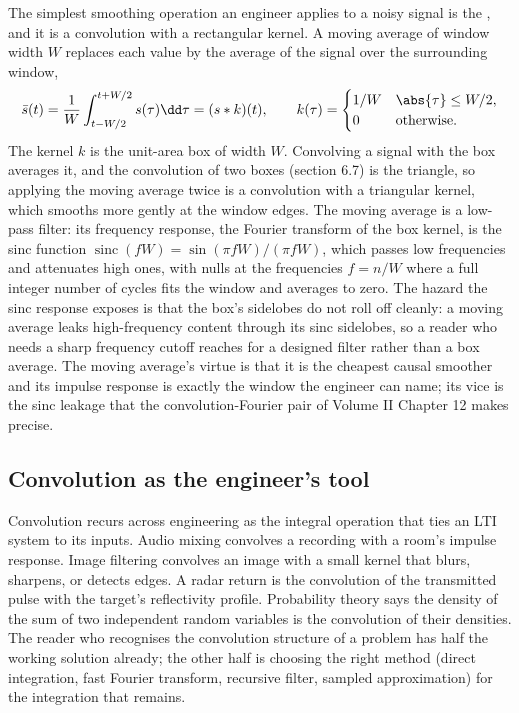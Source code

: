 The simplest smoothing operation an engineer applies to a noisy signal
is the , and it is a convolution with a
rectangular kernel. A moving average of window width $W$ replaces each
value by the average of the signal over the surrounding window,
\[
\bar{s}(t) = \frac{1}{W}\int_{t - W/2}^{t + W/2} s(\tau)\dd\tau =
(s * k)(t), \qquad
k(\tau) = \begin{cases} 1/W & \abs{\tau} \leq W/2, \\ 0 &
\text{otherwise.}\end{cases}
\]
The kernel $k$ is the unit-area box of width $W$. Convolving a signal
with the box averages it, and the convolution of two boxes (section
6.7) is the triangle, so applying the moving average twice is a
convolution with a triangular kernel, which smooths more gently at the
window edges. The moving average is a low-pass filter: its frequency
response, the Fourier transform of the box kernel, is the sinc
function $\operatorname{sinc}(fW) = \sin(\pi fW)/(\pi fW)$, which
passes low frequencies and attenuates high ones, with nulls at the
frequencies $f = n/W$ where a full integer number of cycles fits the
window and averages to zero. The hazard the sinc response exposes is
that the box's sidelobes do not roll off cleanly: a moving average
leaks high-frequency content through its sinc sidelobes, so a reader
who needs a sharp frequency cutoff reaches for a designed filter rather
than a box average. The moving average's virtue is that it is the
cheapest causal smoother and its impulse response is exactly the
window the engineer can name; its vice is the sinc leakage that the
convolution-Fourier pair of Volume II Chapter 12 makes precise.

\subsection{Convolution as the engineer's tool}

Convolution recurs across engineering as the integral operation
that ties an LTI system to its inputs. Audio mixing convolves a
recording with a room's impulse response. Image filtering convolves
an image with a small kernel that blurs, sharpens, or detects
edges. A radar return is the convolution of the transmitted pulse
with the target's reflectivity profile. Probability theory says the
density of the sum of two independent random variables is the
convolution of their densities. The reader who recognises the
convolution structure of a problem has half the working solution
already; the other half is choosing the right method (direct
integration, fast Fourier transform, recursive filter, sampled
approximation) for the integration that remains.


